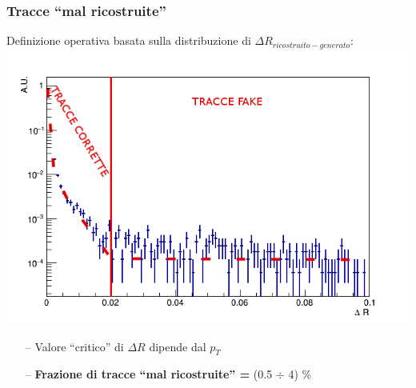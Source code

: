 \documentclass{beamer}
\begin{document}
\begin{frame}
\frametitle{Tracce ``mal ricostruite''}
Definizione operativa basata sulla distribuzione di $\Delta R_{ricostruito - generato}$:
\centering
\includegraphics[width=.7\textwidth]{Tracking/pionMatchingDR2}

\begin{itemize}
\item [\color{black}--] Valore ``critico'' di $\Delta R$ dipende dal $p_{T}$
\item[\color{black}--] \textbf{Frazione di tracce ``mal ricostruite'' = } (0.5 $\div$ 4) \%
\end{itemize}
\end{frame}

\end{document}
